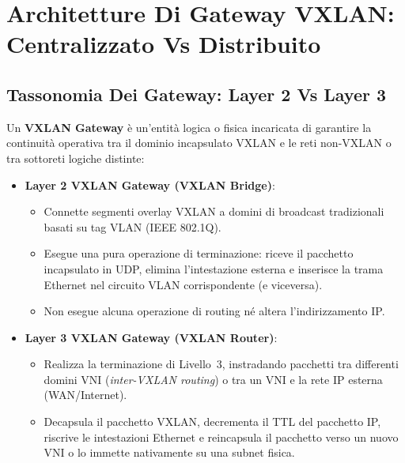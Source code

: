 \documentclass[11pt, a4paper]{article}
\begin{document}
\newpage

\section{Architetture Di Gateway VXLAN: Centralizzato Vs Distribuito}

\subsection{Tassonomia Dei Gateway: Layer 2 Vs Layer 3}

Un \textbf{VXLAN Gateway} è un'entità logica o fisica incaricata di garantire la continuità operativa tra il dominio incapsulato VXLAN e le reti non-VXLAN o tra sottoreti logiche distinte:


\begin{itemize}
    \item \textbf{Layer 2 VXLAN Gateway (VXLAN Bridge)}:
    \begin{itemize}[noitemsep]
        \item Connette segmenti overlay VXLAN a domini di broadcast tradizionali basati su tag VLAN (IEEE 802.1Q).
        \item Esegue una pura operazione di terminazione: riceve il pacchetto incapsulato in UDP, elimina l'intestazione esterna e inserisce la trama Ethernet nel circuito VLAN corrispondente (e viceversa).
        \item Non esegue alcuna operazione di routing né altera l'indirizzamento IP.
    \end{itemize}
    \item \textbf{Layer 3 VXLAN Gateway (VXLAN Router)}:
    \begin{itemize}[noitemsep]
        \item Realizza la terminazione di Livello~3, instradando pacchetti tra differenti domini VNI (\emph{inter-VXLAN routing}) o tra un VNI e la rete IP esterna (WAN/Internet).
        \item Decapsula il pacchetto VXLAN, decrementa il TTL del pacchetto IP, riscrive le intestazioni Ethernet e reincapsula il pacchetto verso un nuovo VNI o lo immette nativamente su una subnet fisica.
    \end{itemize}
\end{itemize}
\end{document}

